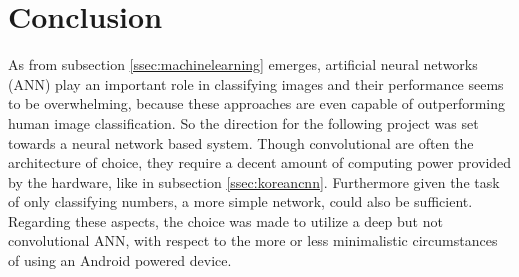\section{Conclusion}
As from subsection \ref{ssec:machinelearning} emerges, artificial neural networks (ANN) play an important role in classifying images and their performance seems to be overwhelming, because these approaches are even capable of outperforming human image classification. So the direction for the following project was set towards a neural network based system. Though convolutional are often the architecture of choice, they require a decent amount of computing power provided by the hardware, like in subsection \ref{ssec:koreancnn}. Furthermore given the task of only classifying numbers, a more simple network, could also be sufficient. Regarding these aspects, the choice was made to utilize a deep but not convolutional ANN, with respect to the more or less minimalistic circumstances of using an Android powered device.